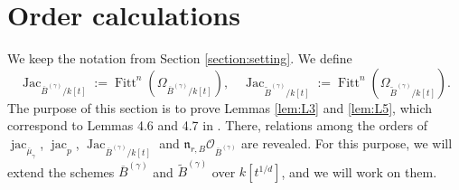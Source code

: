 \documentclass[a4paper,11pt]{amsart}
\theoremstyle{definition}
\theoremstyle{remark}
\begin{document}
\section{Order calculations}\label{section:order}
We keep the notation from Section \ref{section:setting}. 
We define 
\[
\operatorname{Jac}_{\overline{B}^{(\gamma)} /k[t]} := 
\operatorname{Fitt}^{n} \left( \Omega _{\overline{B}^{(\gamma)} /k[t]} \right), \quad 
\operatorname{Jac}_{\widetilde{B}^{(\gamma)} /k[t]} := 
\operatorname{Fitt}^{n} \left( \Omega _{\widetilde{B}^{(\gamma)} /k[t]} \right). 
\]
The purpose of this section is to prove Lemmas \ref{lem:L3} and \ref{lem:L5}, 
which correspond to Lemmas 4.6 and 4.7 in \cite{NS22}. 
There, relations among the orders of 
$\operatorname{jac}_{\overline{\mu} _{\gamma}}$, 
$\operatorname{jac}_{p}$, 
$\operatorname{Jac}_{\overline{B}^{(\gamma)}/k[t]}$ and
$\mathfrak{n}_{r,B} \mathcal{O}_{\overline{B}^{(\gamma)}}$ are revealed. 
For this purpose, we will extend the schemes $\overline{B}^{(\gamma)}$ and $\widetilde{B}^{(\gamma)}$ over $k[t^{1/d}]$, 
and we will work on them.
\end{document}
